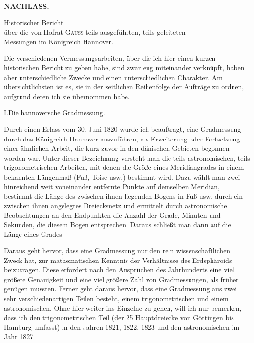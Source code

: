 \noindent{}\hfill{\small\textbf{NACHLASS.}}\hfill\null\par\medskip

\begin{center}
Historischer Bericht\\
über die von Hofrat \textsc{Gauss} teils ausgeführten, teils geleiteten\\
Messungen im Königreich Hannover.
\end{center}

\par\noindent\hspace*{\parindent}Die verschiedenen Vermessungsarbeiten, über die ich hier einen kurzen historischen Bericht zu geben habe, sind zwar eng miteinander verknüpft, haben aber unterschiedliche Zwecke und einen unterschiedlichen Charakter. Am übersichtlichsten ist es, sie in der zeitlichen Reihenfolge der Aufträge zu ordnen, aufgrund deren ich sie übernommen habe.

\par\medskip
\begin{center}
I.\quad Die hannoversche Gradmessung.
\end{center}

\par\noindent\hspace*{\parindent}Durch einen Erlass vom 30. Juni 1820 wurde ich beauftragt, eine Gradmessung durch das Königreich Hannover auszuführen, als Erweiterung oder Fortsetzung einer ähnlichen Arbeit, die kurz zuvor in den dänischen Gebieten begonnen worden war. Unter dieser Bezeichnung versteht man die teils astronomischen, teils trigonometrischen Arbeiten, mit denen die Größe eines Meridiangrades in einem bekannten Längenmaß (Fuß, Toise usw.) bestimmt wird. Dazu wählt man zwei hinreichend weit voneinander entfernte Punkte auf demselben Meridian, bestimmt die Länge des zwischen ihnen liegenden Bogens in Fuß usw. durch ein zwischen ihnen angelegtes Dreiecksnetz und ermittelt durch astronomische Beobachtungen an den Endpunkten die Anzahl der Grade, Minuten und Sekunden, die diesem Bogen entsprechen. Daraus schließt man dann auf die Länge eines Grades.

\par\noindent\hspace*{\parindent}Daraus geht hervor, dass eine Gradmessung  nur den rein wissenschaftlichen Zweck hat, zur mathematischen Kenntnis der Verhältnisse des Erdsphäroids beizutragen. Diese erfordert nach den Ansprüchen des Jahrhunderts eine viel größere Genauigkeit und eine viel größere Zahl von Gradmessungen, als früher genügen mussten. Ferner geht daraus hervor, dass eine Gradmessung aus zwei sehr verschiedenartigen Teilen besteht, einem trigonometrischen und einem astronomischen. Ohne hier weiter ins Einzelne zu gehen, will ich nur bemerken, dass ich den trigonometrischen Teil (der 25 Hauptdreiecke von Göttingen bis Hamburg umfasst) in den Jahren 1821, 1822, 1823 und den astronomischen im Jahr 1827

